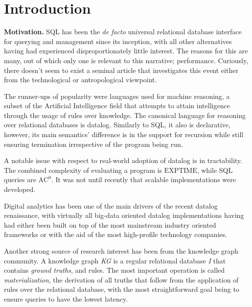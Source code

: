 
\maketitle

\section{Introduction}
\textbf{Motivation.} SQL has been the \textit{de facto} universal relational
database interface for querying and management since its inception,
with all other alternatives having had experienced disproportionately
little interest. The reasons for this are many, out of which only one
is relevant to this narrative; performance. Curiously, there doesn't seem to exist
a seminal article that investigates this event either from the
technological or antropological viewpoint.

The runner-ups of popularity were languages used for machine reasoning,
a subset of the Artificial Intelligence field that attempts to attain
intelligence through the usage of rules over knowledge. The canonical
language for reasoning over relational databases is datalog\cite{datalog}.
Similarly to SQL, it also is declarative, however, its main semantics' difference
is in the support for recursion while still ensuring termination irrespective
of the program being run.

A notable issue with respect to real-world adoption of datalog is in
tractability. The combined complexity of evaluating a program is
$\text{EXPTIME}$\cite{datalog}, while SQL queries are $\text{AC}^0$. It was
not until recently\cite{rdfox, others?} that scalable implementations were
developed.

Digital analytics has been one of the main drivers of the recent datalog renaissance,
with virtually all big-data oriented datalog implementations having had either been built
on top of the most mainstream industry oriented frameworks\cite{bigdatalog,cog,cog2} or with the
aid of the most high-profile technology companies\cite{logica,yedalog,vadalog}.

Another strong source of research interest has been from the knowledge graph community. A
knowledge graph \textit{KG} is a regular relational database \textit{I} that contains
\textit{ground truths}, and rules. The most important operation is called \textit{materialization},
the derivation of all truths that follow from the application of rules over the relational database,
with the most straightforward goal being to ensure queries to have the lowest latency.

